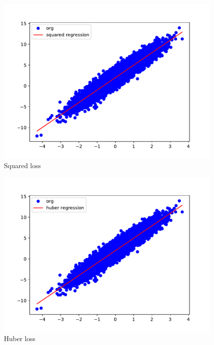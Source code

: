 \documentclass{article}
\begin{document}
\begin{figure}
  \centering
  \includegraphics[scale=0.5]{imgs/squared.pdf}
  \caption{Squared loss}
  \label{squared_loss_fuc}
\end{figure}

\begin{figure}
  \centering
  \includegraphics[scale=0.5]{imgs/huber.pdf}
  \caption{Huber loss}
  \label{huber_loss_fuc}
\end{figure}
\end{document}
